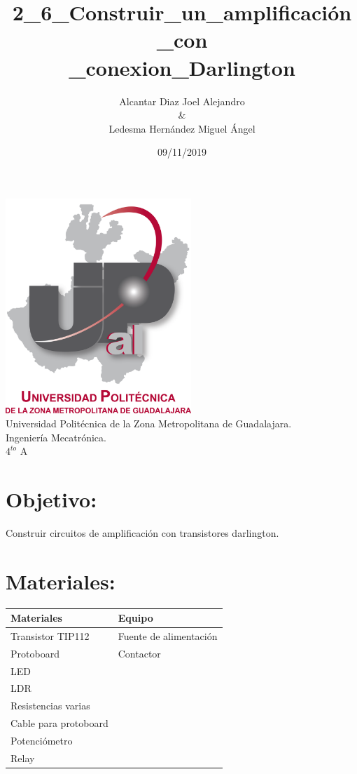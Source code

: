 \documentclass[letterpaper]{article}
\title{2\_6\_Construir\_un\_amplificación\_con\\\_conexion\_Darlington}
\author{Alcantar Diaz Joel Alejandro\\ \& \\Ledesma Hernández Miguel Ángel}
\date{09/11/2019}
\begin{document}
\maketitle
\vspace{2 cm}
\begin{large}
    \begin{center}
        \includegraphics[width=7cm]{IMG/UPZMGlog.png}\\
        Universidad Politécnica de la Zona Metropolitana de Guadalajara.\\
        Ingeniería Mecatrónica.\\
        $4^{to}$ A
    \end{center}
\end{large}
\newpage
\section{Objetivo:}
\begin{large}
    Construir circuitos de amplificación con transistores darlington.
\end{large}
\section{Materiales:}
\begin{large}
    \begin{table}[htbp]
        \centering
        \begin{tabular}{|l|l|}
            \hline
            Materiales            & Equipo \\ \hline
            Transistor TIP112     & Fuente de alimentación \\ \hline
            Protoboard            & Contactor \\ \hline
            LED                   & \\ \hline
            LDR                   & \\ \hline
            Resistencias varias   & \\ \hline
            Cable para protoboard & \\ \hline
            Potenciómetro         & \\ \hline
            Relay                 & \\ \hline
        \end{tabular}
    \end{table}
\end{large}
\end{document}
